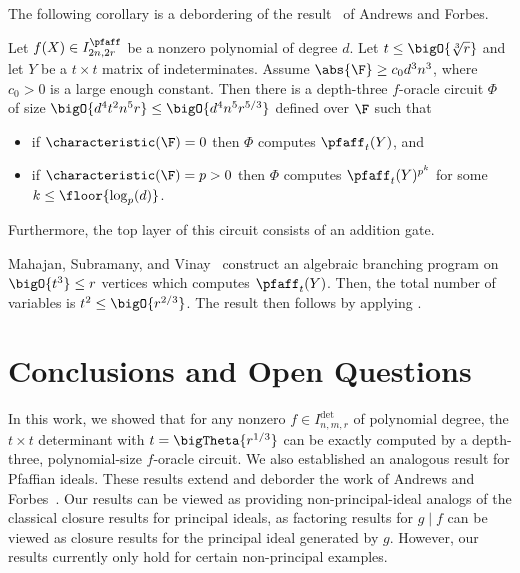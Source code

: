 \documentclass[letterpaper, 11pt]{amsart}
\begin{document}
The following corollary is a debordering of the result~\cite[Corollary 4.5]{AF21} of Andrews and Forbes.
\begin{cor}\label{cor:pfaff_oracle_for_pfaff}
    Let $f(X) \in I^{\pfaff}_{2n, 2r}$ be a nonzero polynomial of degree $d$.
    Let $t \leq \bigO{\sqrt[3]{r}}$ and let $Y$ be a $t \times t$ matrix of indeterminates.
    Assume $\abs{\F} \geq c_0 d^3 n^3$, where $c_0>0$ is a large enough constant.
    Then there is a depth-three $f$-oracle circuit $\Phi$ of size $\bigO{d^4 t^2 n^5 r} \leq \bigO{d^4 n^5 r^{5 / 3}}$ defined over $\F$ such that
    \begin{itemize}
        \item if $\characteristic(\F) = 0$ then $\Phi$ computes $\pfaff_t(Y)$, and
        \item if $\characteristic(\F) = p > 0$ then $\Phi$ computes $\pfaff_t(Y)^{p^k}$ for some $k \leq \floor{\log_p(d)}$.
    \end{itemize}
    Furthermore, the top layer of this circuit consists of an addition gate.
\end{cor}
\begin{pf}
    Mahajan, Subramany, and Vinay~\cite[Theorem 12]{MSV04} construct an algebraic branching program on $\bigO{t^3} \leq r$ vertices which computes $\pfaff_{t}(Y)$.
    Then, the total number of variables is $t^2 \leq \bigO{r^{2 / 3}}$.
    The result then follows by applying .
\end{pf}


\section{Conclusions and Open Questions}

In this work, we showed that for any nonzero $f \in I^{\det}_{n,m,r}$ of polynomial degree, the $t\times t$ determinant with $t = \bigTheta{r^{1/3}}$ can be exactly computed by a depth-three, polynomial-size $f$-oracle circuit.
We also established an analogous result for Pfaffian ideals.
These results extend and deborder the work of Andrews and Forbes~\cite{AF21}.
Our results can be viewed as providing non-principal-ideal analogs of the classical closure results for principal ideals, as factoring results for $g \mid f$ can be viewed as closure results for the principal ideal generated by $g$.
However, our results currently only hold for certain non-principal examples.
\end{document}
